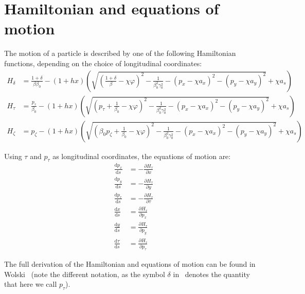 \section{Hamiltonian and equations of motion}

The motion of a particle is described by one of the following Hamiltonian functions,
depending on the choice of longitudinal coordinates:
\begin{align}
 H_\delta   &= \frac{1+\delta}{\beta\beta_0} - (1+h x) \left(
      \sqrt{ \left(\frac{1+\delta}{\beta}-\chi\varphi\right)^2
           - \frac{1}{\beta_0^2\gamma_0^2}
           - (p_x - \chi a_x)^2
           - (p_y - \chi a_y)^2}
       + \chi a_s
    \right) \\
 H_\tau   &= \frac{p_\tau}{\beta_0} - (1+h x) \left(
      \sqrt{ \left(p_\tau+\frac{1}{\beta_0}-\chi\varphi\right)^2
           - \frac{1}{\beta_0^2\gamma_0^2}
           - (p_x - \chi a_x)^2
           - (p_y - \chi a_y)^2}
       + \chi a_s
    \right) \label{eq:hamiltonian_htau}\\
  H_\zeta &= p_\zeta - (1+h x) \left(
      \sqrt{ \left(\beta_0 p_\zeta+\frac{1}{\beta_0}-\chi\varphi\right)^2
           - \frac{1}{\beta_0^2\gamma_0^2}
           - (p_x - \chi a_x)^2
           - (p_y - \chi a_y)^2}
       + \chi a_s
    \right)
\end{align}

Using $\tau$ and $p_\tau$ as longitudinal coordinates, the equations of motion are:
\begin{align}
  \frac{\text{d} p_x}{\text{d}s} &=
    -\frac{\partial H_\tau}{\partial x} \\
  \frac{\text{d} p_y}{\text{d}s} &=
    -\frac{\partial H_\tau}{\partial y} \\
  \frac{\text{d} p_\tau}{\text{d}s} &=
    -\frac{\partial H_\tau}{\partial \tau} \\
  \frac{\text{d} x}{\text{d}s} &=
    \frac{\partial H_\tau}{\partial p_x} \\
  \frac{\text{d} y}{\text{d}s} &=
    \frac{\partial H_\tau}{\partial p_y} \\
  \frac{\text{d} \tau}{\text{d}s} &=
    \frac{\partial H_\tau}{\partial p_\tau}
\end{align}

The full derivation of the Hamiltonian and equations of motion can be found in
Wolski~\cite{wolski2014beam} (note the different notation, as the symbol $\delta$
in~\cite{wolski2014beam} denotes the quantity that here we call $p_\tau$).

